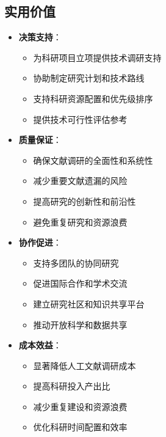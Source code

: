 \documentclass[12pt,a4paper]{article}
\begin{document}
\subsection{实用价值}
\begin{itemize}
    \item \textbf{决策支持}：
        \begin{itemize}
            \item 为科研项目立项提供技术调研支持
            \item 协助制定研究计划和技术路线
            \item 支持科研资源配置和优先级排序
            \item 提供技术可行性评估参考
        \end{itemize}
    
    \item \textbf{质量保证}：
        \begin{itemize}
            \item 确保文献调研的全面性和系统性
            \item 减少重要文献遗漏的风险
            \item 提高研究的创新性和前沿性
            \item 避免重复研究和资源浪费
        \end{itemize}
    
    \item \textbf{协作促进}：
        \begin{itemize}
            \item 支持多团队的协同研究
            \item 促进国际合作和学术交流
            \item 建立研究社区和知识共享平台
            \item 推动开放科学和数据共享
        \end{itemize}
    
    \item \textbf{成本效益}：
        \begin{itemize}
            \item 显著降低人工文献调研成本
            \item 提高科研投入产出比
            \item 减少重复建设和资源浪费
            \item 优化科研时间配置和效率
        \end{itemize}
\end{itemize}
\end{document}
